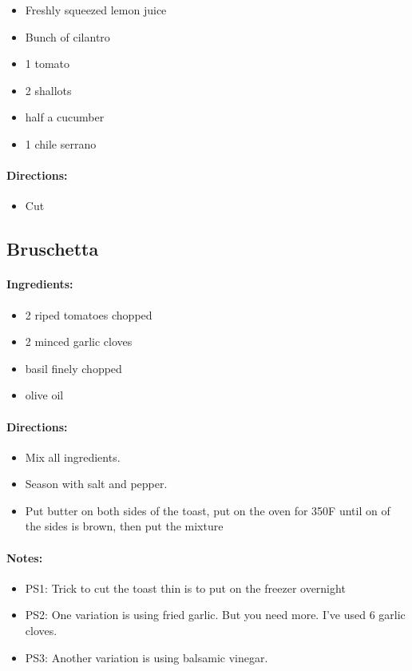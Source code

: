 \documentclass{article}
\begin{document}
\begin{itemize}
	\item Freshly squeezed lemon juice
	\item Bunch of cilantro
	\item 1 tomato
	\item 2 shallots
	\item half a cucumber
	\item 1 chile serrano 
\end{itemize}

\paragraph{Directions:}
\begin{itemize}
	\item Cut
\end{itemize}

\subsection{Bruschetta}

\paragraph{Ingredients:}

\begin{itemize}
	\item 2 riped tomatoes chopped
	\item 2 minced garlic cloves
	\item basil finely chopped
	\item olive oil
\end{itemize}

\paragraph{Directions:}
\begin{itemize}
	\item Mix all ingredients.
	\item Season with salt and pepper.
	\item Put butter on both sides of the toast, put on the oven for 350F until on of the sides is brown, then put the mixture
\end{itemize}

\paragraph{Notes:}
\begin{itemize}
	\item PS1: Trick to cut the toast thin is to put on the freezer overnight
	\item PS2: One variation is using fried garlic. But you need more. I've used 6 garlic cloves.
	\item PS3: Another variation is using balsamic vinegar.
\end{itemize}
\end{document}
